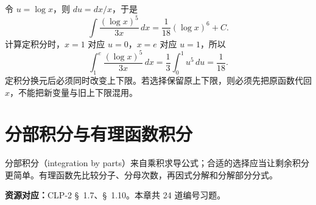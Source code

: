 \documentclass[12pt,fontset=fandol]{ctexart}
\begin{document}
\begin{solve}\label{ans:c12q24}
令 $u=\log x$，则 $du=dx/x$，于是
\[
\int\frac{(\log x)^{5}}{3x}\,dx=\frac{1}{18}(\log x)^{6}+C.
\]
计算定积分时，$x=1$ 对应 $u=0$，$x=e$ 对应 $u=1$，所以
\[
\int_1^e\frac{(\log x)^{5}}{3x}\,dx=\frac1{3}\int_0^1u^{5}\,du=\frac{1}{18}.
\]
定积分换元后必须同时改变上下限。若选择保留原上下限，则必须先把原函数代回 $x$，不能把新变量与旧上下限混用。
\end{solve}

\clearpage
\section{分部积分与有理函数积分}\label{sec:ch13}
分部积分（integration by parts）来自乘积求导公式；合适的选择应当让剩余积分更简单。有理函数先比较分子、分母次数，再因式分解和分解部分分式。

\textbf{资源对应：}CLP-2 \S~1.7、\S~1.10。本章共 24 道编号习题。
\end{document}
